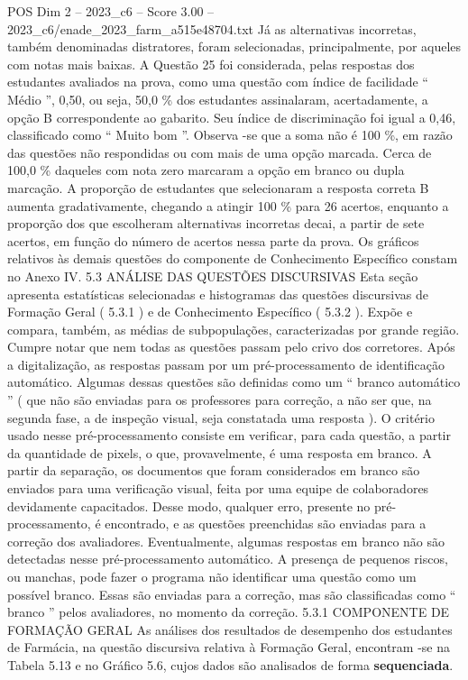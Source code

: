 \begin{textsample}{POS Dim 2 – 2023\_c6 – Score 3.00 – 2023\_c6/enade\_2023\_farm\_a515e48704.txt}
Já as alternativas incorretas, também denominadas distratores, foram selecionadas, principalmente, por aqueles com notas mais baixas.
A Questão 25 foi considerada, pelas respostas dos estudantes avaliados na prova, como uma questão com índice de facilidade “ Médio ”, 0,50, ou seja, 50,0 \% dos estudantes assinalaram, acertadamente, a opção B correspondente ao gabarito.
Seu índice de discriminação foi igual a 0,46, classificado como “ Muito bom ”.
Observa -se que a soma não é 100 \%, em razão das questões não respondidas ou com mais de uma opção marcada.
Cerca de 100,0 \% daqueles com nota zero marcaram a opção em branco ou dupla marcação.
A proporção de estudantes que selecionaram a resposta correta B aumenta gradativamente, chegando a atingir 100 \% para 26 acertos, enquanto a proporção dos que escolheram alternativas incorretas decai, a partir de sete acertos, em função do número de acertos nessa parte da prova.
Os gráficos relativos às demais questões do componente de Conhecimento Específico constam no Anexo IV. 5.3 ANÁLISE DAS QUESTÕES DISCURSIVAS Esta seção apresenta estatísticas selecionadas e histogramas das questões discursivas de Formação Geral ( 5.3.1 ) e de Conhecimento Específico ( 5.3.2 ).
Expõe e compara, também, as médias de subpopulações, caracterizadas por grande região.
Cumpre notar que nem todas as questões passam pelo crivo dos corretores.
Após a digitalização, as respostas passam por um pré-processamento de identificação automático.
Algumas dessas questões são definidas como um “ branco automático ” ( que não são enviadas para os professores para correção, a não ser que, na segunda fase, a de inspeção visual, seja constatada uma resposta ).
O critério usado nesse pré-processamento consiste em verificar, para cada questão, a partir da quantidade de pixels, o que, provavelmente, é uma resposta em branco.
A partir da separação, os documentos que foram considerados em branco são enviados para uma verificação visual, feita por uma equipe de colaboradores devidamente capacitados.
Desse modo, qualquer erro, presente no pré-processamento, é encontrado, e as questões preenchidas são enviadas para a correção dos avaliadores.
Eventualmente, algumas respostas em branco não são detectadas nesse pré-processamento automático.
A presença de pequenos riscos, ou manchas, pode fazer o programa não identificar uma questão como um possível branco.
Essas são enviadas para a correção, mas são classificadas como “ branco ” pelos avaliadores, no momento da correção. 5.3.1 COMPONENTE DE FORMAÇÃO GERAL As análises dos resultados de desempenho dos estudantes de Farmácia, na questão discursiva relativa à Formação Geral, encontram -se na Tabela 5.13 e no Gráfico 5.6, cujos dados são analisados de forma \textbf{sequenciada}.

\end{textsample}
